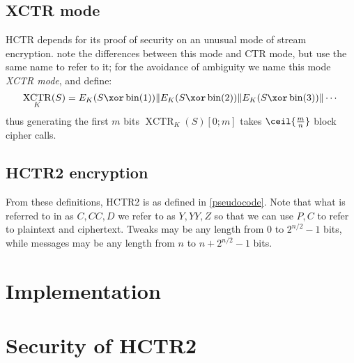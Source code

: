 \documentclass[letterpaper,11pt]{article}
\newcommand*{\Concat}{\Vert}
\DeclareMathOperator{\fromint}{bin}
\DeclareMathOperator{\XCTR}{XCTR}
\begin{document}
\subsection{XCTR mode}

HCTR depends for its proof of security
on an unusual mode of stream encryption.
\cite{hctr,hctr2} note the differences between this mode and CTR mode,
but use the same name to refer to it; for the avoidance of ambiguity
we name this mode \emph{XCTR mode}, and define:
\begin{displaymath}
    \XCTR_K(S) = E_K(S \xor \fromint(1)) \Concat E_K(S \xor \fromint(2)) \Concat E_K(S \xor \fromint(3)) \Concat \cdots
\end{displaymath}
thus generating the first \(m\) bits \(\XCTR_K(S)[0; m]\) takes \(\ceil{\frac{m}{n}}\) block cipher calls.

\subsection{HCTR2 encryption}

From these definitions, HCTR2 is as defined in \autoref{pseudocode}.
Note that what is referred to in \cite{hctr,hctr2} as \(C, \mathit{CC}, D\)
we refer to as \(Y, YY, Z\)
so that we can use \(P, C\) to refer to plaintext and ciphertext.
Tweaks may be any length from 0 to \(2^{n/2}-1\) bits, while
messages may be any length from \(n\) to \(n + 2^{n/2}-1\) bits.

\section{Implementation}


\section{Security of HCTR2}
\end{document}
